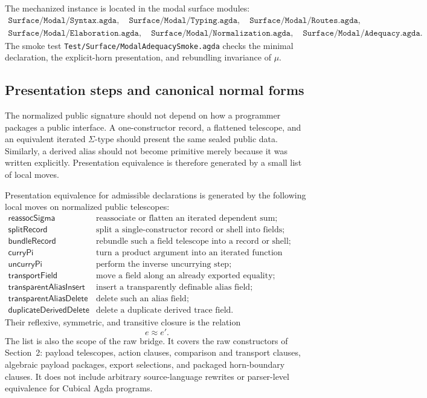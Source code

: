 The mechanized instance is located in the modal surface modules:
\[
\begin{gathered}
\texttt{Surface/Modal/Syntax.agda},\quad
\texttt{Surface/Modal/Typing.agda},\quad
\texttt{Surface/Modal/Routes.agda},\\
\texttt{Surface/Modal/Elaboration.agda},\quad
\texttt{Surface/Modal/Normalization.agda},\quad
\texttt{Surface/Modal/Adequacy.agda}.
\end{gathered}
\]
The smoke test \texttt{Test/Surface/ModalAdequacySmoke.agda} checks the minimal
declaration, the explicit-horn presentation, and rebundling invariance of \(\mu\).

\subsection{Presentation steps and canonical normal forms}

The normalized public signature should not depend on how a programmer packages a public
interface.  A one-constructor record, a flattened telescope, and an equivalent iterated
\(\Sigma\)-type should present the same sealed public data.  Similarly, a derived alias should
not become primitive merely because it was written explicitly.  Presentation equivalence is
therefore generated by a small list of local moves.

\begin{definition}
Presentation equivalence for admissible declarations is generated by the following local
moves on normalized public telescopes:
\[
\begin{array}{ll}
\mathsf{reassocSigma} & \text{reassociate or flatten an iterated dependent sum;}\\
\mathsf{splitRecord} & \text{split a single-constructor record or shell into fields;}\\
\mathsf{bundleRecord} & \text{rebundle such a field telescope into a record or shell;}\\
\mathsf{curryPi} & \text{turn a product argument into an iterated function telescope;}\\
\mathsf{uncurryPi} & \text{perform the inverse uncurrying step;}\\
\mathsf{transportField} & \text{move a field along an already exported equality;}\\
\mathsf{transparentAliasInsert} & \text{insert a transparently definable alias field;}\\
\mathsf{transparentAliasDelete} & \text{delete such an alias field;}\\
\mathsf{duplicateDerivedDelete} & \text{delete a duplicate derived trace field.}
\end{array}
\]
Their reflexive, symmetric, and transitive closure is the relation
\[
  e \approx e'.
\]
The list is also the scope of the raw bridge.  It covers the raw constructors of
Section~2: payload telescopes, action clauses, comparison and transport clauses, algebraic
payload packages, export selections, and packaged horn-boundary clauses.  It does not include
arbitrary source-language rewrites or parser-level equivalence for Cubical Agda programs.
\end{definition}

